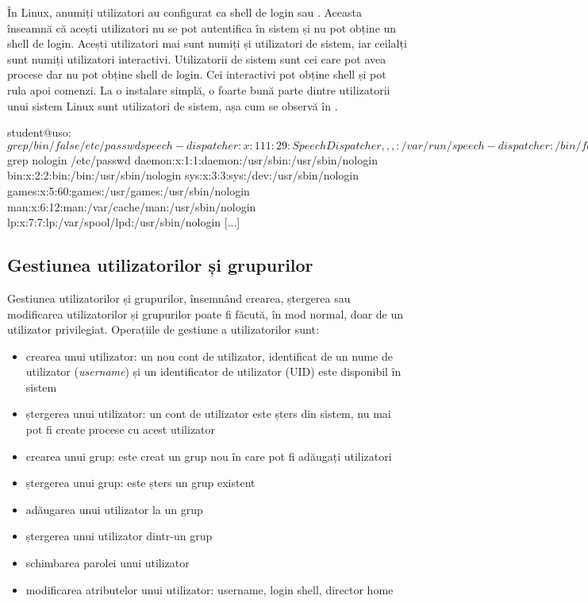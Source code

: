În Linux, anumiți utilizatori au configurat ca shell de login  sau .
Aceasta înseamnă că acești utilizatori nu se pot autentifica în sistem și nu pot obține un shell de login.
Acești utilizatori mai sunt numiți și utilizatori de sistem, iar ceilalți sunt numiți utilizatori interactivi.
Utilizatorii de sistem sunt cei care pot avea procese dar nu pot obține shell de login.
Cei interactivi pot obține shell și pot rula apoi comenzi.
La o instalare simplă, o foarte bună parte dintre utilizatorii unui sistem Linux sunt utilizatori de sistem, așa cum se observă în .

\begin{screen}[caption={Afișarea utilizatorilor de sistem},label={lst:user:system-users}]
student@uso:~$ grep /bin/false /etc/passwd
speech-dispatcher:x:111:29:Speech Dispatcher,,,:/var/run/speech-dispatcher:/bin/false
whoopsie:x:112:117::/nonexistent:/bin/false
hplip:x:118:7:HPLIP system user,,,:/var/run/hplip:/bin/false
gnome-initial-setup:x:120:65534::/run/gnome-initial-setup/:/bin/false
gdm:x:121:125:Gnome Display Manager:/var/lib/gdm3:/bin/false
vboxadd:x:999:1::/var/run/vboxadd:/bin/false

student@uso:~$ grep nologin /etc/passwd
daemon:x:1:1:daemon:/usr/sbin:/usr/sbin/nologin
bin:x:2:2:bin:/bin:/usr/sbin/nologin
sys:x:3:3:sys:/dev:/usr/sbin/nologin
games:x:5:60:games:/usr/games:/usr/sbin/nologin
man:x:6:12:man:/var/cache/man:/usr/sbin/nologin
lp:x:7:7:lp:/var/spool/lpd:/usr/sbin/nologin
[...]
\end{screen}

\subsection{Gestiunea utilizatorilor și grupurilor}
\label{sec:user:groups}

Gestiunea utilizatorilor și grupurilor, însemnând crearea, ștergerea sau modificarea utilizatorilor și grupurilor poate fi făcută, în mod normal, doar de un utilizator privilegiat.
Operațiile de gestiune a utilizatorilor sunt:

\begin{itemize}
  \item crearea unui utilizator: un nou cont de utilizator, identificat de un nume de utilizator (\textit{username}) și un identificator de utilizator (UID) este disponibil în sistem
  \item ștergerea unui utilizator: un cont de utilizator este șters din sistem, nu mai pot fi create procese cu acest utilizator
  \item crearea unui grup: este creat un grup nou în care pot fi adăugați utilizatori
  \item ștergerea unui grup: este șters un grup existent
  \item adăugarea unui utilizator la un grup
  \item ștergerea unui utilizator dintr-un grup
  \item schimbarea parolei unui utilizator
  \item modificarea atributelor unui utilizator: username, login shell, director home
\end{itemize}


